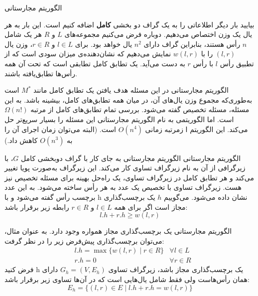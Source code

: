 \begin{itemframe}{الگوریتم مجارستانی}
\itm

بیایید بار دیگر اطلاعاتی را به یک گراف دو بخشی \textbf{کامل} اضافه کنیم است.
این بار به هر یال یک وزن اختصاص می‌دهیم.
دوباره فرض می‌کنیم مجموعه‌های $L$ و $R$ هر یک شامل $n$ رأس هستند، بنابراین گراف دارای
$n^2$
یال خواهد بود.
\itm
برای $l \in L$ و $r \in R$، وزن یال $(l, r)$ را با $w(l, r)$ نمایش می‌دهیم که نشان‌دهنده‌ی میزان سودی است که از تطبیق رأس $l$ با رأس $r$ به دست می‌آید.
\itm
یک تطابق کامل
 تطابقی است که تحت آن همه رأس‌ها تطابق‌یافته باشند.

\end{itemframe}

\begin{itemframe}{الگوریتم مجارستانی}
\itm
در این مسئله هدف یافتن یک تطابق کامل مانند
$M^*$
 است به‌طوری‌که مجموع وزن یال‌های آن، در میان همه تطابق‌های کامل، بیشینه باشد.
به این مسئله،‌ مسئله تخصیص
 گفته می‌شود.
\itm
بررسی تمام تطابق‌های کامل از مرتبه
$ \Omega (n!)$
است. اما الگوریتمی به نام الگوریتم مجارستانی
 این مسئله را بسیار سریع‌تر حل می‌کند.
\itm
این الگوریتم ا زمرتبه زمانی
$O(n^4)$
 است.
(البته می‌توان زمان اجرای آن را به
$O(n^3)$
 کاهش داد.)
\end{itemframe}

\begin{itemframe}{الگوریتم مجارستانی}
\itm
الگوریتم مجارستانی به جای کار با گراف دوبخشی کامل $G$، با زیرگرافی از آن به نام زیرگراف تساوی
کار می‌کند.
این زیرگراف به‌صورت پویا تغییر می‌کند و هر تطابق کامل در زیرگراف تساوی، یک راه‌حل بهینه برای مسئله تخصیص نیز هست.
\itm
زیرگراف تساوی با تخصیص یک عدد به هر رأس ساخته می‌شود. به این عدد برچسب رأس گفته می‌شود و با h نشان داده می‌شود.
\itm
می‌گوییم $h$ یک برچسب‌گذاری مجاز
است اگر برای همه $l \in L$ و $r \in R$ رابطه زیر برقرار باشد:
$$l.h + r.h \geq w(l, r)$$
\end{itemframe}

\begin{itemframe}{الگوریتم مجارستانی}
\itm
یک برچسب‌گذاری مجاز همواره وجود دارد. به عنوان مثال، می‌توان برچسب‌گذاری پیش‌فرض زیر را در نظر گرفت:
\begin{align*}
&l.h = \max \{ w(l, r) \mid r \in R \} &\forall l \in L\\
&r.h = 0 &\forall r \in R
\end{align*}
\itm
فرض کنید h یک برچسب‌گذاری مجاز باشد، زیرگراف تساوی $G_h = (V, E_h)$ دارای همان رأس‌هاست ولی فقط شامل یال‌هایی است که در آن‌ها تساوی زیر برقرار باشد:
$$
E_h = \{ (l, r) \in E \mid l.h + r.h = w(l, r) \}
$$
\end{itemframe}

